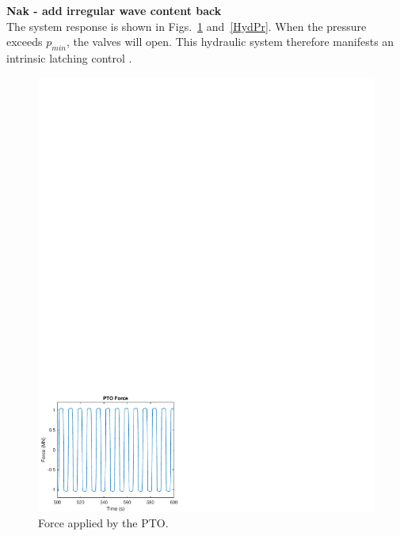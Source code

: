 \documentclass[twocolumn,10pt]{asme2e}
\begin{document}
\textbf{Nak - add irregular wave content back} \\

The system response is shown in Figs.~\ref{HydF} and~\ref{HydPr}. When the pressure exceeds $p_{min}$, the valves will open. This hydraulic system therefore manifests an intrinsic latching control \cite{falnes2005ocean}.

\begin{figure}[t]
    \centering
    \includegraphics[width=1\columnwidth]{Images/ptoForce}
    \caption{Force applied by the PTO.}
    \label{HydF}
    \end{figure}
\end{document}
